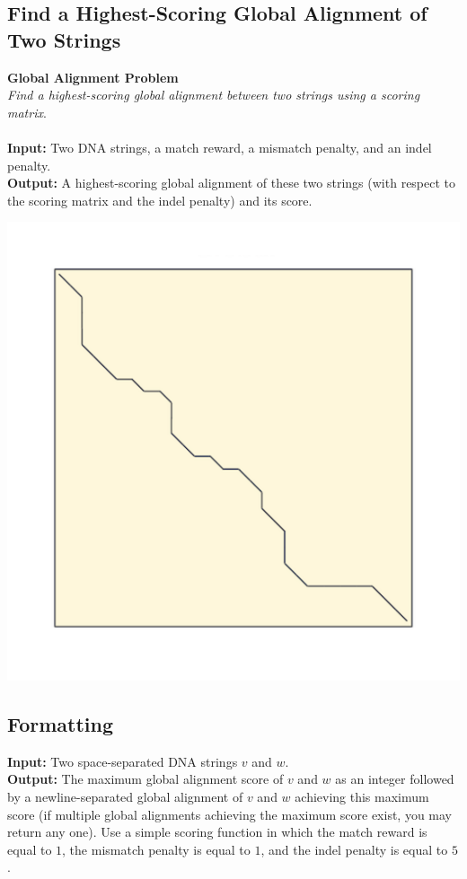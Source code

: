 \documentclass{article}
\begin{document}
\subsection{Find a Highest-Scoring Global Alignment of Two Strings}
\hline\vspace{5}
\textbf{Global Alignment Problem}\\
\emph{Find a highest-scoring global alignment between two strings using a scoring matrix}.\\ \\
\textbf{Input:} Two DNA strings, a match reward, a mismatch penalty, and an indel penalty.\\
\textbf{Output:} A highest-scoring global alignment of these two strings (with respect to the scoring matrix and the indel penalty) and its score.
\begin{center}
    \includegraphics[scale=0.2]{c5/logos/5E.png}
\end{center}
\hline\vspace{5}

\subsection*{Formatting}
\noindent\textbf{Input:} Two space-separated DNA strings $v$ and $w$.\\
\noindent\textbf{Output:} The maximum global alignment score of $v$ and $w$ as an integer followed by a newline-separated global alignment of $v$ and $w$ achieving this maximum score (if multiple global alignments achieving the maximum score exist, you may return any one). Use a simple scoring function in which the match reward is equal to $1$, the mismatch penalty is equal to $1$, and the indel penalty is equal to $5$.
\end{document}
